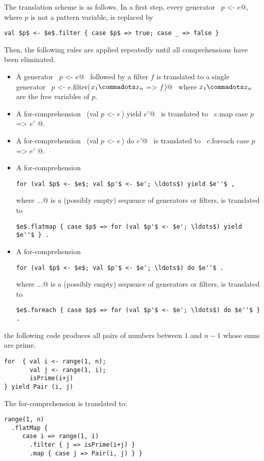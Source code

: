 \documentclass[a4paper,12pt,twoside,titlepage]{book}
\begin{document}
The translation scheme is as follows. 
In a first step, every generator ~\lstinline@val $p$ <- $e$@, where $p$ is not
a pattern variable, is replaced by
\begin{lstlisting}
val $p$ <- $e$.filter { case $p$ => true; case _ => false }
\end{lstlisting}
Then, the following
rules are applied repeatedly until all comprehensions have been eliminated.
\begin{itemize}
\item
A generator ~\lstinline@val $p$ <- $e$@~ followed by a filter $f$ is translated to
a single generator ~\lstinline@val $p$ <- $e$.filter($x_1 \commadots x_n$ => $f\,$)@~ where
$x_1 \commadots x_n$ are the free variables of $p$.

\item
A for-comprehension 
~\lstinline@for (val $p$ <- $e\,$) yield $e'$@~ 
is translated to
~\lstinline@$e$.map { case $p$ => $e'$ }@.

\item
A for-comprehension
~\lstinline@for (val $p$ <- $e\,$) do $e'$@~ 
is translated to
~\lstinline@$e$.foreach { case $p$ => $e'$ }@.

\item
A for-comprehension
\begin{lstlisting}
for (val $p$ <- $e$; val $p'$ <- $e'; \ldots$) yield $e''$ ,
\end{lstlisting}
where \lstinline@$\ldots$@ is a (possibly empty)
sequence of generators or filters,
is translated to
\begin{lstlisting}
$e$.flatmap { case $p$ => for (val $p'$ <- $e'; \ldots$) yield $e''$ } .
\end{lstlisting}
\item
A for-comprehension
\begin{lstlisting}
for (val $p$ <- $e$; val $p'$ <- $e'; \ldots$) do $e''$ .
\end{lstlisting}
where \lstinline@$\ldots$@ is a (possibly empty)
sequence of generators or filters,
is translated to
\begin{lstlisting}
$e$.foreach { case $p$ => for (val $p'$ <- $e'; \ldots$) do $e''$ } .
\end{lstlisting}
\end{itemize}

\example
the following code produces all pairs of numbers
between $1$ and $n-1$ whose sums are prime.
\begin{lstlisting}
for  { val i <- range(1, n);
       val j <- range(1, i);
       isPrime(i+j)
} yield Pair (i, j)
\end{lstlisting}
The for-comprehension is translated to:
\begin{lstlisting}
range(1, n)
  .flatMap {
     case i => range(1, i)
       .filter { j => isPrime(i+j) }
       .map { case j => Pair(i, j) } }
\end{lstlisting}
\end{document}
